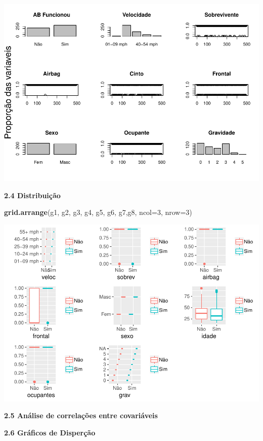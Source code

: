 \documentclass[]{article}
\newenvironment{Shaded}{\begin{snugshade}}{\end{snugshade}}
\newcommand{\KeywordTok}[1]{\textcolor[rgb]{0.13,0.29,0.53}{\textbf{{#1}}}}
\newcommand{\DataTypeTok}[1]{\textcolor[rgb]{0.13,0.29,0.53}{{#1}}}
\newcommand{\DecValTok}[1]{\textcolor[rgb]{0.00,0.00,0.81}{{#1}}}
\newcommand{\NormalTok}[1]{{#1}}
\begin{document}
\includegraphics{Dados_Binários1_files/figure-latex/unnamed-chunk-5-1.pdf}

\textbf{2.4 Distribuição}

\begin{Shaded}
\begin{Highlighting}[]
\KeywordTok{grid.arrange}\NormalTok{(g1, g2, g3, g4, g5, g6, g7,g8, }\DataTypeTok{ncol=}\DecValTok{3}\NormalTok{, }\DataTypeTok{nrow=}\DecValTok{3}\NormalTok{)}
\end{Highlighting}
\end{Shaded}

\includegraphics{Dados_Binários1_files/figure-latex/unnamed-chunk-7-1.pdf}

\textbf{2.5 Análise de correlações entre covariáveis}

\textbf{2.6 Gráficos de Disperção}
\end{document}
